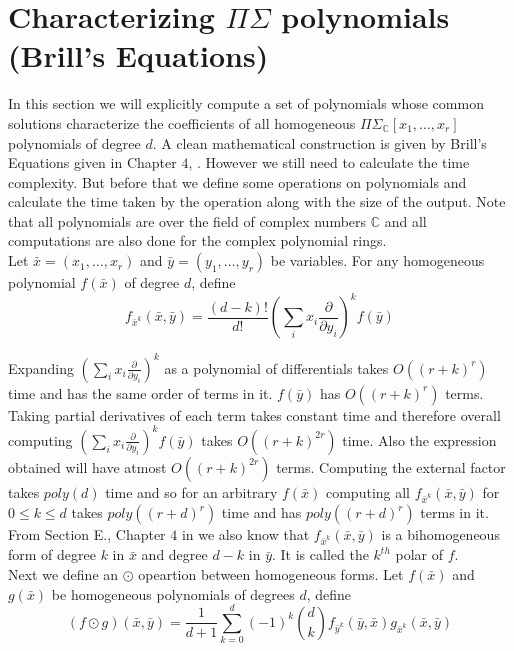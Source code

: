 \documentclass[letterpaper,USenglish,numberwithinsect]{lipics}
\newcommand{\C}{\mathbb{C}}
\newcommand{\B}[1]{\bar{#1}}
\begin{document}
\newpage

\appendix





\section{Characterizing $\Pi\Sigma$ polynomials (Brill's Equations)}\label{brills}
In this section we will explicitly compute a set of polynomials whose common solutions characterize the coefficients
of all homogeneous $\Pi\Sigma_\C[x_1,\ldots,x_r]$ polynomials of degree $d$. A clean mathematical construction is given by Brill's Equations given in Chapter $4$,
\cite{GKZ94}.
However we still need to calculate the time complexity. But before that we define some operations on
polynomials and calculate the time taken by the operation along with the size of the output. Note that all polynomials are
over the field of complex numbers $\C$ and all computations are also done for the complex polynomial rings.\\

Let $\B{x} = (x_1,\ldots,x_r)$ and $\B{y} = (y_1,\ldots,y_r)$ be variables. For any homogeneous polynomial $f(\B{x})$
of degree $d$, define
\[
 f_{\B{x}^k}(\B{x},\B{y}) = \frac{(d-k)!}{d!}(\sum\limits_{i}x_i\frac{\partial}{\partial y_i})^k f(\B{y})
\]

Expanding $(\sum\limits_{i}x_i\frac{\partial}{\partial y_i})^k$ as a polynomial of differentials takes
$O((r+k)^r)$ time and has the same order of terms in it. $f(\B{y})$ has $O((r+k)^r)$ terms. Taking
partial derivatives of each term takes constant time and therefore overall computing
$(\sum\limits_{i}x_i\frac{\partial}{\partial y_i})^k f(\B{y})$ takes $O((r+k)^{2r})$ time. Also
the expression obtained will have atmost $O((r+k)^{2r})$ terms. Computing the external
factor takes $poly(d)$ time and so for an arbitrary $f(\B{x})$ computing all $f_{\B{x}^k}(\B{x},\B{y})$
for $0\leq k\leq d$ takes $poly((r+d)^r)$ time and has $poly((r+d)^r)$ terms in it. From Section E., Chapter $4$ in \cite{GKZ94}
we also know that $f_{\B{x}^k}(\B{x},\B{y})$ is a bihomogeneous form of degree $k$ in $\B{x}$ and degree $d-k$ in $\B{y}$. It
is called the $k^{th}$ polar of $f$.\\

Next we define an $\odot$ opeartion between homogeneous forms. Let $f(\B{x})$ and $g(\B{x})$ be homogeneous polynomials
of degrees $d$, define
\[
(f\odot g)(\B{x},\B{y}) = \frac{1}{d+1}\sum\limits_{k=0}^d(-1)^k{d\choose k}f_{\B{y}^k}(\B{y},\B{x})g_{\B{x}^k}(\B{x},\B{y})
\]
\end{document}
